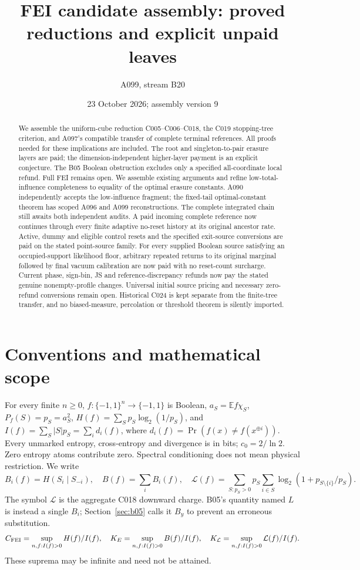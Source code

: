 \documentclass[11pt]{article}
\title{FEI candidate assembly: proved reductions and explicit unpaid leaves}
\author{A099, stream B20}
\date{23 October 2026; assembly version 9}
\newcommand{\E}{\mathbb E}
\begin{document}
\maketitle
\begin{abstract}
We assemble the uniform-cube reduction C005--C006--C018, the
C019 stopping-tree criterion, and A097's compatible transfer of complete
terminal references. All proofs needed for these implications are included.
The root and singleton-to-pair erasure layers are paid; the
dimension-independent higher-layer payment is an explicit conjecture.
The B05 Boolean obstruction excludes only a specified all-coordinate local
refund. Full FEI remains open. We assemble existing arguments and refine
low-total-influence completeness to equality of the optimal erasure constants.
A090 independently accepts the low-influence fragment; the fixed-tail
optimal-constant theorem has scoped A096 and A099 reconstructions.
The complete integrated chain still awaits both independent audits.
A paid incoming complete reference now continues through every finite
adaptive no-reset history at its original ancestor rate. Active, dummy and eligible control resets and the specified exit-source
conversions are paid on the stated point-source family. For every supplied Boolean source satisfying an occupied-support likelihood
floor, arbitrary repeated returns to its original marginal followed by
final vacuum calibration are now paid with no reset-count surcharge.
Current phase, sign-bin, JS and reference-discrepancy refunds now pay
the stated genuine nonempty-profile changes. Universal initial source
pricing and necessary zero-refund conversions remain open.
Historical C024 is kept separate from the
finite-tree transfer, and no biased-measure, percolation or threshold theorem
is silently imported.
\end{abstract}

\section{Conventions and mathematical scope}
For every finite $n\ge0$, $f:\{-1,1\}^n\to\{-1,1\}$ is Boolean,
$a_S=\E f\chi_S$, $P_f(S)=p_S=a_S^2$,
$H(f)=\sum_Sp_S\log_2(1/p_S)$, and
$I(f)=\sum_S|S|p_S=\sum_i d_i(f)$, where
$d_i(f)=\Pr(f(x)\ne f(x^{\oplus i}))$.
Every unmarked entropy, cross-entropy and divergence is in bits;
$c_0=2/\ln2$. Zero entropy atoms contribute zero. Spectral conditioning
does not mean physical restriction. We write
\[
 B_i(f)=H(S_i\mid S_{-i}),\quad B(f)=\sum_i B_i(f),\quad
 \mathcal L(f)=\sum_{S:p_S>0}p_S\sum_{i\in S}
                    \log_2(1+p_{S\setminus\{i\}}/p_S).
\]
The symbol $\mathcal L$ is the aggregate C018 downward charge. B05's
quantity named $L$ is instead a single $B_i$; Section~\ref{sec:b05}
calls it $B_y$ to prevent an erroneous substitution.
\[
C_{\rm FEI}=\sup_{n,f:I(f)>0} H(f)/I(f),\quad
K_E=\sup_{n,f:I(f)>0} B(f)/I(f),\quad
K_{\mathcal L}=\sup_{n,f:I(f)>0}\mathcal L(f)/I(f).
\]
These suprema may be infinite and need not be attained.
\end{document}
